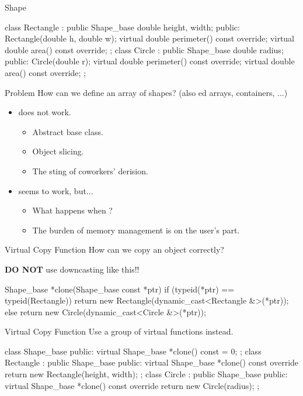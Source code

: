 \documentclass{beamer}
\begin{document}
\begin{frame}[fragile]{Shape}
    \begin{cpp}
class Rectangle : public Shape_base {
  double height, width;
 public:
  Rectangle(double h, double w);
  virtual double perimeter() const override;
  virtual double area() const override;
};
class Circle : public Shape_base {
  double radius;
 public:
  Circle(double r);
  virtual double perimeter() const override;
  virtual double area() const override;
};
    \end{cpp}
\end{frame}

\begin{frame}{Problem}
    How can we define an array of shapes? (also ed arrays, containers, ...)
    \begin{itemize}
        \item {} does not work.
        \begin{itemize}
            \item Abstract base class.
            \item Object slicing.
            \item The sting of coworkers' derision.
        \end{itemize}
        \item {} seems to work, but...
        \begin{itemize}
            \item What happens when ?
            \item The burden of memory management is on the user's part.
        \end{itemize}
    \end{itemize}
\end{frame}

\begin{frame}[fragile]{Virtual Copy Function}
    How can we copy an object correctly?\par
    \pause
    \textbf{DO NOT} use downcasting like this!!
    \begin{cpp}
Shape_base *clone(Shape_base const *ptr) {
  if (typeid(*ptr) == typeid(Rectangle))
    return new Rectangle(dynamic_cast<Rectangle &>(*ptr));
  else
    return new Circle(dynamic_cast<Circle &>(*ptr));
}
    \end{cpp}
\end{frame}

\begin{frame}[fragile]{Virtual Copy Function}
    Use a group of virtual functions instead.
    \begin{cpp}
class Shape_base {
 public:
  virtual Shape_base *clone() const = 0;
};
class Rectangle : public Shape_base {
 public:
  virtual Shape_base *clone() const override
    { return new Rectangle(height, width); }
};
class Circle : public Shape_base {
 public:
  virtual Shape_base *clone() const override
    { return new Circle(radius); }
};
    \end{cpp}
\end{frame}
\end{document}
